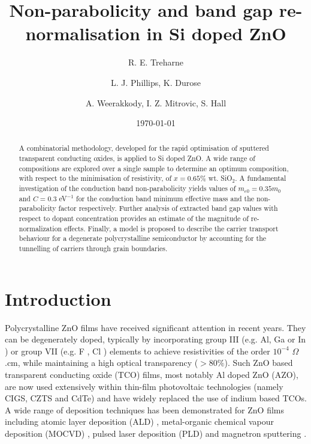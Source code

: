\documentclass[aps,prl,preprint,showpacs,showkeys, linenumbers]{revtex4-1}
\begin{document}
\title{Non-parabolicity and band gap re-normalisation in Si doped ZnO}
\author{R. E. Treharne}
\author{L. J. Phillips, K. Durose}
\author{A. Weerakkody, I. Z. Mitrovic, S. Hall}
\date{\today}
\begin{abstract}
A combinatorial methodology, developed for the rapid optimisation of sputtered transparent conducting oxides, is applied to Si doped ZnO. A wide range of compositions are explored over a single sample to determine an optimum composition, with respect to the minimisation of resistivity, of $x=0.65\%$ wt. SiO$_2$. A fundamental investigation of the conduction band non-parabolicity yields values of $m_{e0}=0.35m_0$ and $C=0.3$ eV$^{-1}$ for the conduction band minimum effective mass and the non-parabolicity factor respectively. Further analysis of extracted band gap values with respect to dopant concentration provides an estimate of the magnitude of re-normalization effects. Finally, a model is proposed to describe the carrier transport behaviour for a degenerate polycrystalline semiconductor by accounting for the tunnelling of carriers through grain boundaries.
\end{abstract}
\maketitle




\linenumbers


\section{Introduction}

Polycrystalline ZnO films have received significant attention in recent years. They can be degenerately doped, typically by incorporating group III (e.g. Al, Ga or In \cite{Minami2005}) or group VII (e.g. F \cite{Gordon1991, Treharne2010}, Cl \cite{Lincot2009}) elements to achieve resistivities of the order $10^{-4}$ $\Omega$.cm, while maintaining a high optical transparency ($>80\%$). Such ZnO based transparent conducting oxide (TCO) films, most notably Al doped ZnO (AZO), are now used extensively within thin-film photovoltaic technologies (namely CIGS, CZTS and CdTe) and have widely replaced the use of indium based TCOs. A wide range of deposition techniques has been demonstrated for ZnO films including atomic layer deposition (ALD) \cite{Chalker2013}, metal-organic chemical vapour deposition (MOCVD) \cite{Myong1997}, pulsed laser deposition (PLD) \cite{Shin2006} and magnetron sputtering \cite{Minami2005, Minami2006, Ellmer2001}. 
\end{document}
